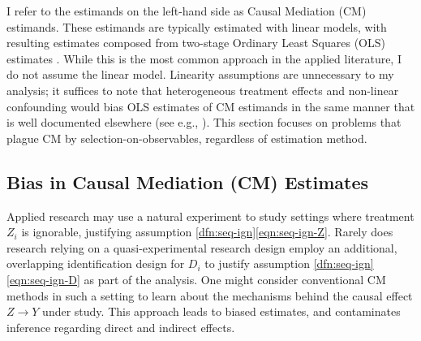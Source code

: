 I refer to the estimands on the left-hand side as Causal Mediation (CM) estimands.
These estimands are typically estimated with linear models, with resulting estimates composed from two-stage Ordinary Least Squares (OLS) estimates \citep{imai2010identification}.
While this is the most common approach in the applied literature, I do not assume the linear model.
Linearity assumptions are unnecessary to my analysis; it suffices to note that heterogeneous treatment effects and non-linear confounding would bias OLS estimates of CM estimands in the same manner that is well documented elsewhere (see e.g., \citealt{angrist1998estimating,sloczynski2022interpreting}).
This section focuses on problems that plague CM by selection-on-observables, regardless of estimation method.

\subsection{Bias in Causal Mediation (CM) Estimates}
Applied research may use a natural experiment to study settings where treatment $Z_i$ is ignorable, justifying assumption \ref{dfn:seq-ign}\eqref{eqn:seq-ign-Z}.
Rarely does research relying on a quasi-experimental research design employ an additional, overlapping identification design for $D_i$ to justify assumption \ref{dfn:seq-ign}\eqref{eqn:seq-ign-D} as part of the analysis.
One might consider conventional CM methods in such a setting to learn about the mechanisms behind the causal effect $Z \to Y$ under study.
This approach leads to biased estimates, and contaminates inference regarding direct and indirect effects.

